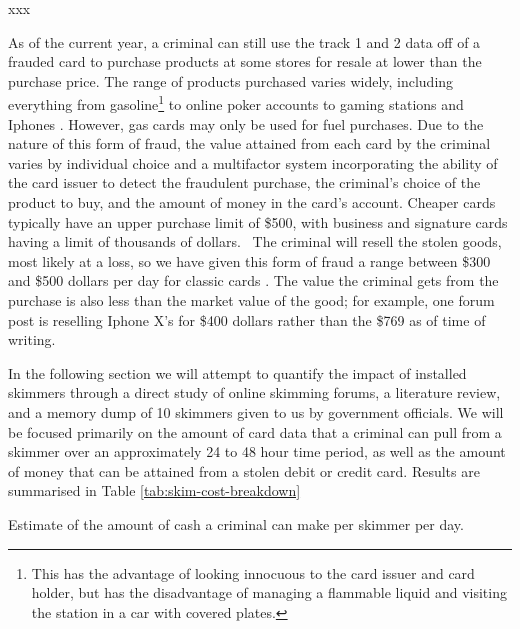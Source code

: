 xxx

As of the current year, a criminal can still use the track 1 and 2 data off of a frauded card to purchase products at
some stores for resale at lower than the purchase price. \cite{cardingGeneralGuide, howToSucceedInStore}
%
The range of products purchased varies widely, including everything from gasoline\footnote{This has the advantage of
looking innocuous to the card issuer and card holder, but has the disadvantage of managing a flammable liquid and
visiting the station in a car with covered plates.} \cite{krebsbladder} to online poker
accounts \cite{cardingPokerstars} to gaming stations and Iphones \cite{cardingBuyStuff}.
%
However, gas cards may only be used for fuel purchases.
%
Due to the nature of this form of fraud, the value attained from each card by the criminal varies by individual choice
and a multifactor system incorporating the ability of the card issuer to detect the fraudulent purchase, the criminal's
choice of the product to buy, and the amount of money in the card's account. \cite{viceInterviewWithCarder}
%
Cheaper cards typically have an upper purchase limit of \$500, with business and signature cards having a limit of
thousands of dollars.~\cite{cardingGeneralGuide}
%
The criminal will resell the stolen goods, most likely at a loss, so we have given this form of fraud a range
between \$300 and \$500 dollars per day for classic cards \cite{cardingNewbieGuide, viceInterviewWithCarder}.
%
The value the criminal gets from the purchase is also less than the market value of the good; for example, one forum
post is reselling Iphone X's for \$400 dollars rather than the \$769 as of time of writing. \cite{iphoneXSale}







In the following section we will attempt to quantify the impact of installed skimmers through a direct study of online
skimming forums, a literature review, and a memory dump of 10 skimmers given to us by government officials. We will be
focused primarily on the amount of card data that a criminal can pull from a skimmer over an approximately 24 to 48
hour time period, as well as the amount of money that can be attained from a stolen debit or credit card. Results
are summarised in Table \ref{tab:skim-cost-breakdown}

\begin{table}
    \centering\small
    
    \caption{Estimate of the amount of cash a criminal can make per skimmer per day.}
    \label{tab:skim-cost-breakdown}
\end{table}





